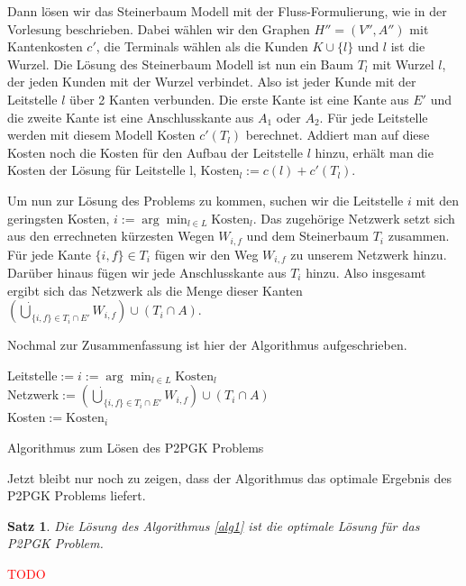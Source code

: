 \documentclass[11pt,a4paper]{article}
\makeatletter
\newcommand{\TODO}{\textcolor{red}{TODO}}
\theoremstyle{my_th_style1}
\newtheorem{satz}{Satz}
\renewenvironment{proof}[1][\proofname]{\par 
	\pushQED{\qed}%
	\normalfont \topsep6\p@\@plus6\p@\relax 
	\trivlist 
	\item[\hskip\labelsep 
	\bfseries 
	#1\@addpunct{:}]\ignorespaces 
}{%
\popQED\endtrivlist\@endpefalse 
}
\makeatother
\begin{document}
Dann lösen wir das Steinerbaum Modell mit der Fluss-Formulierung, wie in der Vorlesung beschrieben. Dabei wählen wir den Graphen $H''=(V'',A'')$ mit Kantenkosten $c'$, die Terminals wählen als die Kunden $K \cup \{l\}$ und $l$ ist die Wurzel. Die Lösung des Steinerbaum Modell ist nun ein Baum $T_l$ mit Wurzel $l$, der jeden Kunden mit der Wurzel verbindet. Also ist jeder Kunde mit der Leitstelle $l$ über 2 Kanten verbunden. Die erste Kante ist eine Kante aus $E'$ und die zweite Kante ist eine Anschlusskante aus $A_1$ oder $A_2$. Für jede Leitstelle werden mit diesem Modell Kosten $c'(T_l)$ berechnet. Addiert man auf diese Kosten noch die Kosten für den Aufbau der Leitstelle $l$ hinzu, erhält man die Kosten der Lösung für Leitstelle l, $\text{Kosten}_l:=c(l)+c'(T_l)$.

Um nun zur Lösung des Problems zu kommen, suchen wir die Leitstelle $i$ mit den geringsten Kosten, $i:=\arg \displaystyle\min_{l \in L} \text{Kosten}_l$. Das zugehörige Netzwerk setzt sich aus den errechneten kürzesten Wegen  $W_{i,f}$ und dem Steinerbaum $T_i$ zusammen. Für jede Kante $\{i,f\} \in T_i$ fügen wir den Weg $W_{i,f}$ zu unserem Netzwerk hinzu. Darüber hinaus fügen wir jede Anschlusskante aus $T_i$ hinzu. Also insgesamt ergibt sich  das Netzwerk als die Menge dieser Kanten $(\dot{\bigcup}_{\{i,f\} \in T_i \cap E'}W_{i,f}) \cup (T_i\cap A)$.

Nochmal zur Zusammenfassung ist hier der Algorithmus aufgeschrieben.

\vspace{0.5cm}
\begin{algorithm}[H]
	\label{alg1}
\BlankLine

	Leitstelle$:=i:=\arg \displaystyle\min_{l \in L} \text{Kosten}_l$\\
	Netzwerk$:=(\dot{\bigcup}_{\{i,f\} \in T_i \cap E'}W_{i,f}) \cup (T_i\cap A)$\\
	Kosten$:=\text{Kosten}_{i}$
	\BlankLine
\caption{Algorithmus zum Lösen des P2PGK Problems}
\end{algorithm}
\vspace{0.5cm}
Jetzt bleibt nur noch zu zeigen, dass der Algorithmus das optimale Ergebnis des P2PGK Problems liefert.
\begin{satz}
	Die Lösung des Algorithmus \ref{alg1} ist die optimale Lösung für das P2PGK Problem.
\end{satz}
\begin{proof}
	\TODO
\end{proof}
\end{document}
